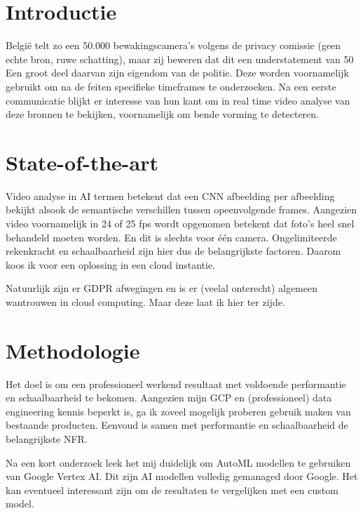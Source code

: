 
\section{Introductie}%
\label{sec:introductie}

België telt zo een 50.000 bewakingscamera's volgens de privacy comissie (geen echte bron, ruwe schatting), maar zij beweren dat dit een understatement van 50%
Een groot deel daarvan zijn eigendom van de politie. Deze worden voornamelijk gebruikt om na de feiten specifieke timeframes te onderzoeken.
Na een eerste communicatie blijkt er interesse van hun kant om in real time video analyse van deze bronnen te bekijken, voornamelijk om bende vorming te detecteren.

\section{State-of-the-art}%
\label{sec:state-of-the-art}

Video analyse in AI termen betekent dat een CNN afbeelding per afbeelding bekijkt alsook de semantische verschillen tussen opeenvolgende frames.
Aangezien video voornamelijk in 24 of 25 fps wordt opgenomen betekent dat foto's heel snel behandeld moeten worden. En dit is slechts voor één camera.
Ongelimiteerde rekenkracht en schaalbaarheid zijn hier dus de belangrijkste factoren. Daarom koos ik voor een oplossing in een cloud instantie.

Natuurlijk zijn er GDPR afwegingen en is er (veelal onterecht) algemeen wantrouwen in cloud computing. Maar deze laat ik hier ter zijde.

\section{Methodologie}%
\label{sec:methodologie}

Het doel is om een professioneel werkend resultaat met voldoende performantie en schaalbaarheid te bekomen. Aangezien mijn GCP en (professioneel) data engineering kennis beperkt is,
ga ik zoveel mogelijk proberen gebruik maken van bestaande producten. Eenvoud is samen met performantie en schaalbaarheid de belangrijkste NFR.

Na een kort onderzoek leek het mij duidelijk om AutoML modellen te gebruiken van Google Vertex AI. Dit zijn AI modellen volledig gemanaged door Google.
Het kan eventueel interessant zijn om de resultaten te vergelijken met een custom model.

